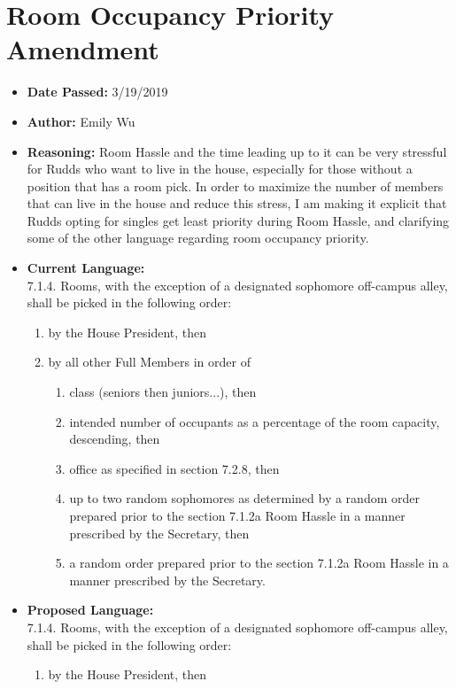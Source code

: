 \documentclass[10pt]{article} %
\begin{document}
\section{Room Occupancy Priority Amendment}
\begin{itemize}
	\item \textbf{Date Passed:} 3/19/2019
	\item \textbf{Author:} Emily Wu
	\item \textbf{Reasoning:} Room Hassle and the time leading up to it can be very stressful for Rudds who want to live in the house, especially for those without a position that has a room pick. In order to maximize the number of members that can live in the house and reduce this stress, I am making it explicit that Rudds opting for singles get least priority during Room Hassle, and clarifying some of the other language regarding room occupancy priority.  
	\item \textbf{Current Language:} \\
	7.1.4. Rooms, with the exception of a designated sophomore off-campus alley, shall be picked in the following order: 
	\begin{enumerate}[label=(\alph*)]
		\item by the House President, then 
		\item by all other Full Members in order of 
		\begin{enumerate}[label=(\roman*)]
			\item class (seniors then juniors...), then 
			\item intended number of occupants as a percentage of the room capacity, descending, then 
			\item office as specified in section 7.2.8, then 
			\item up to two random sophomores as determined by a random order prepared prior to the section 7.1.2a Room Hassle in a manner prescribed by the Secretary, then 
			\item a random order prepared prior to the section 7.1.2a Room Hassle in a manner prescribed by the Secretary.
		\end{enumerate}
	\end{enumerate}
	\item \textbf{Proposed Language:} \\
	7.1.4. Rooms, with the exception of a designated sophomore off-campus alley, shall be picked in the following order: 
	\begin{enumerate}[label=(\alph*)]
		\item by the House President, then 

\end{enumerate}
\end{itemize}
\end{document}
